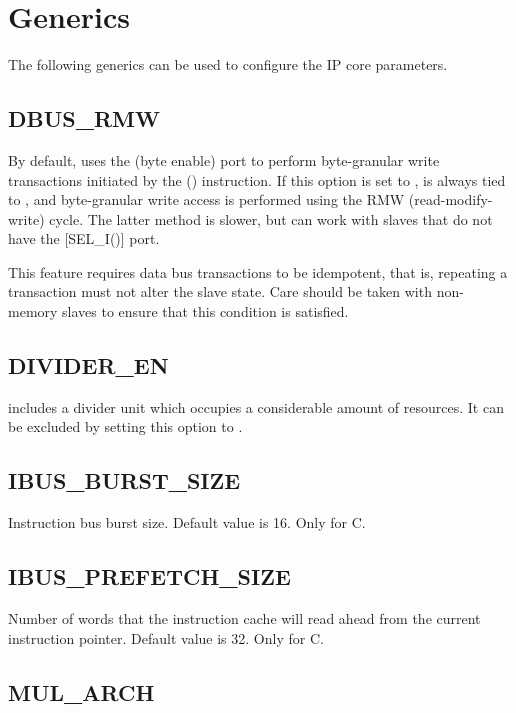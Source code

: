 \documentclass[a4paper,12pt,twoside,extrafontsizes]{memoir}
\begin{document}
\section{Generics}
\label{sec:generics}

The following generics can be used to configure the \lxp{} IP core parameters.

\subsection{DBUS\_RMW}

By default, \lxp{} uses the  (byte enable) port to perform byte-granular write transactions initiated by the  () instruction. If this option is set to ,  is always tied to , and byte-granular write access is performed using the RMW (read-modify-write) cycle. The latter method is slower, but can work with slaves that do not have the [SEL\_I()] port.

This feature requires data bus transactions to be idempotent, that is, repeating a transaction must not alter the slave state. Care should be taken with non-memory slaves to ensure that this condition is satisfied.

\subsection{DIVIDER\_EN}

\lxp{} includes a divider unit which occupies a considerable amount of resources. It can be excluded by setting this option to .

\subsection{IBUS\_BURST\_SIZE}

Instruction bus burst size. Default value is 16. Only for \lxp{}C.

\subsection{IBUS\_PREFETCH\_SIZE}

Number of words that the instruction cache will read ahead from the current instruction pointer. Default value is 32. Only for \lxp{}C.

\subsection{MUL\_ARCH}
\end{document}
